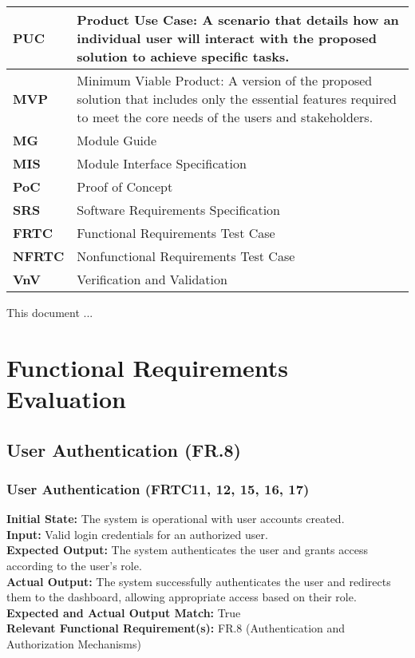 \documentclass[12pt, titlepage]{article}
\begin{document}
\begin{longtable}[c]{|p{}|p{}|}
  \textbf{PUC} & Product Use Case: A scenario that details how an individual user will interact with the proposed solution to achieve specific tasks. \\ \hline
  \textbf{MVP} & Minimum Viable Product: A version of the proposed solution that includes only the essential features required to meet the core needs of the users and stakeholders. \\ \hline
  \textbf{MG} & Module Guide \\ \hline
  \textbf{MIS} & Module Interface Specification \\ \hline
  \textbf{PoC} & Proof of Concept \\ \hline
  \textbf{SRS} & Software Requirements Specification \\ \hline
  \textbf{FRTC} & Functional Requirements Test Case \\ \hline
  \textbf{NFRTC} & Nonfunctional Requirements Test Case \\ \hline
  \textbf{VnV} & Verification and Validation \\ \hline
\end{longtable}

\newpage

\tableofcontents

\listoftables %

\listoffigures %

\newpage


This document ...

\section{Functional Requirements Evaluation}

\subsection{User Authentication (FR.8)}
\subsubsection{User Authentication (FRTC11, 12, 15, 16, 17)}
\textbf{Initial State:} The system is operational with user accounts created.\\
\textbf{Input:} Valid login credentials for an authorized user.\\
\textbf{Expected Output:} The system authenticates the user and grants access according to the user's role.\\
\textbf{Actual Output:} The system successfully authenticates the user and redirects them to the dashboard, allowing appropriate access based on their role.\\
\textbf{Expected and Actual Output Match:} True\\
\textbf{Relevant Functional Requirement(s):} FR.8 (Authentication and Authorization Mechanisms)\\
\end{document}
